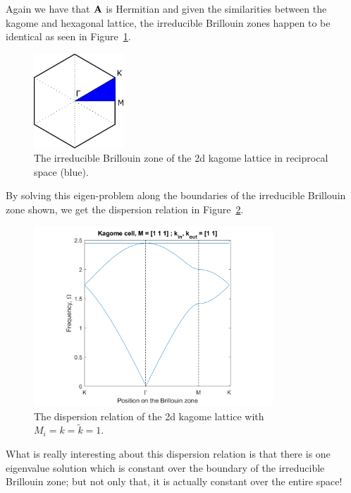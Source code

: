 Again we have that $\mathbf{A}$ is Hermitian and given the similarities between
the kagome and hexagonal lattice, the irreducible Brillouin zones happen to be
identical as seen in Figure~\ref{fig:ibzonekagome}.

\begin{figure}[!h]
\centering
\includegraphics[width=0.3\textwidth]{imgs/kagomeibz.png}
\caption{\label{fig:ibzonekagome} The irreducible Brillouin zone of the 2d
    kagome lattice in reciprocal space (blue).}
\end{figure}

By solving this eigen-problem along the boundaries of the irreducible Brillouin
zone shown, we get the dispersion relation in Figure~\ref{fig:kagomedisper}.

\begin{figure}[!h]
\centering
\includegraphics[width=0.8\textwidth]{imgs/kagomedisper.png}
\caption{\label{fig:kagomedisper} The dispersion relation of the 2d kagome
    lattice with $M_i=k=\tilde{k}=1$.}
\end{figure}

What is really interesting about this dispersion relation is that there is one
eigenvalue solution which is constant over the boundary of the irreducible
Brillouin zone; but not only that, it is actually constant over the entire
space!
